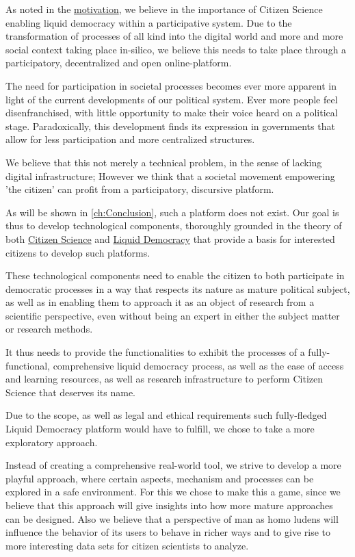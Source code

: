 As noted in the \hyperref[sec:Motivation]{motivation}, we believe in the importance of Citizen Science enabling liquid democracy within a participative system. Due to the transformation of processes of all kind into the digital world and more and more social context taking place in-silico, we believe this needs to take place through a participatory, decentralized and open online-platform.

The need for participation in societal processes becomes ever more apparent in light of the current developments of our political system. Ever more people feel disenfranchised, with little opportunity to make their voice heard on a political stage. Paradoxically, this development finds its expression in governments that allow for less participation and more centralized structures.

We believe that this not merely a technical problem, in the sense of lacking digital infrastructure; However we think that a societal movement empowering 'the citizen' can profit from a participatory, discursive platform.

As will be shown in \ref{ch:Conclusion}, such a platform does not exist. Our goal is thus to develop technological components, thoroughly grounded in the theory of both \hyperref[sec:Theory_CS]{Citizen Science} and \hyperref[sec:Liquid_Democracy]{Liquid Democracy} that provide a basis for interested citizens to develop such platforms.

These technological components need to enable the citizen to both participate in democratic processes in a way that respects its nature as mature political subject, as well as in enabling them to approach it as an object of research from a scientific perspective, even without being an expert in either the subject matter or research methods. 

It thus needs to provide the functionalities to exhibit the processes of a fully-functional, comprehensive liquid democracy process, as well as the ease of access and learning resources, as well as research infrastructure to perform Citizen Science that deserves its name.

Due to the scope, as well as legal and ethical requirements such fully-fledged Liquid Democracy platform would have to fulfill, we chose to take a more exploratory approach. 

Instead of creating a comprehensive real-world tool, we strive to develop a more playful approach, where certain aspects, mechanism and processes can be explored in a safe environment. For this we chose to make this a game, since we believe that this approach will give insights into how more mature approaches can be designed. Also we believe that a perspective of man as homo ludens will influence the behavior of its users to behave in richer ways and to give rise to more interesting data sets for citizen scientists to analyze.

